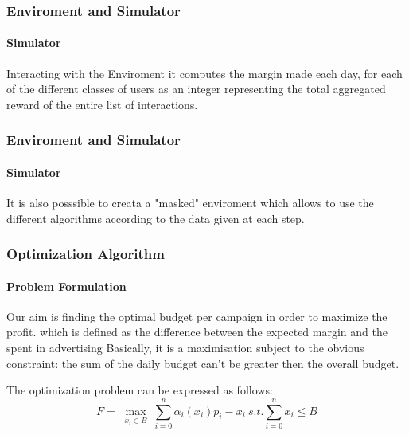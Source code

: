 \documentclass{beamer}
\begin{document}
\begin {frame}
\frametitle{Enviroment and Simulator}
\framesubtitle{Simulator}
Interacting with the Enviroment it computes the margin made each day, for each of the different classes of users as an integer representing the total aggregated reward of the entire list of interactions.
\end{frame}
\begin {frame}
\frametitle{Enviroment and Simulator}
\framesubtitle{Simulator}
It is also posssible to creata a "masked" enviroment which allows to use the different algorithms according to the data given at each step.
\end{frame}

\begin {frame}
\frametitle{Optimization Algorithm}
\framesubtitle{Problem Formulation}
\label{sec:Opt_Problem Formulation}
Our aim is finding the optimal budget per campaign in order to maximize the profit.
which is defined as the difference between the expected margin and the spent in advertising 
Basically, it is a maximisation subject to the obvious constraint: the sum of the daily budget can't be greater then the overall budget.

The optimization problem can be expressed as follows:
\begin{displaymath}
F=\max_{\substack{x_i\in B}} \sum_{i=0}^n \alpha_i(x_i)p_i-x_i \ s.t. \sum_{i=0}^n x_i\leq B  
\end{displaymath}
\end{frame}
\end{document}
